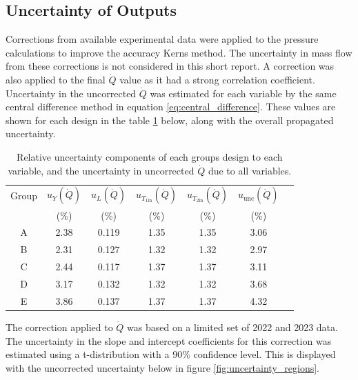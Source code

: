 \documentclass{article}
\begin{document}
\subsection{Uncertainty of Outputs}
Corrections from available experimental data were applied to the pressure calculations to improve the accuracy Kerns method.
The uncertainty in mass flow from these corrections is not considered in this short report.
A correction was also applied to the final $\dot{Q}$ value as it had a strong correlation coefficient.
Uncertainty in the uncorrected $\dot{Q}$ was estimated for each variable by the same central difference method in equation \ref{eq:central_difference}.
These values are shown for each design in the table \ref{tab:uncorrected_uncertainty} below, along with the overall propagated uncertainty.

\begin{table}[h!]
    \centering
    \begin{tabular}{c|cccccc}
        \hline
        Group & $u_Y(\dot{Q})$ & $u_L(\dot{Q})$ & $u_{T_\text{1in}}(\dot{Q})$ & $u_{T_\text{2in}}(\dot{Q})$ & $u_\text{unc}(\dot{Q})$ \\
         & (\%) & (\%) & (\%) & (\%) & (\%) \\
        \hline
        A & 2.38 & 0.119 & 1.35 & 1.35 & 3.06 \\
        B & 2.31 & 0.127 & 1.32 & 1.32 & 2.97 \\
        C & 2.44 & 0.117 & 1.37 & 1.37 & 3.11 \\
        D & 3.17 & 0.132 & 1.32 & 1.32 & 3.68 \\
        E & 3.86 & 0.137 & 1.37 & 1.37 & 4.32 \\
        \hline
    \end{tabular}
    \caption{Relative uncertainty components of each groups design to each variable, and the uncertainty in uncorrected $\dot{Q}$ due to all variables.}
    \label{tab:uncorrected_uncertainty}
\end{table}

The correction applied to $\dot{Q}$ was based on a limited set of 2022 and 2023 data.
The uncertainty in the slope and intercept coefficients for this correction was estimated using a t-distribution with a 90\% confidence level.
This is displayed with the uncorrected uncertainty below in figure \ref{fig:uncertainty_regions}.
\end{document}
